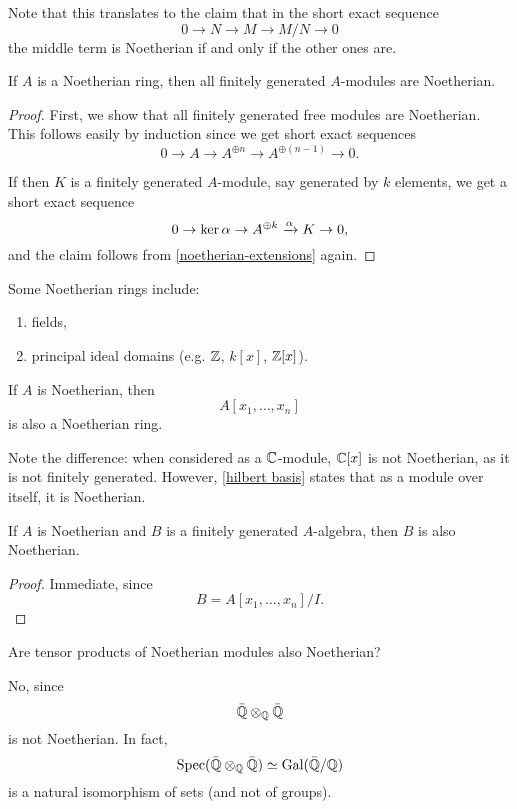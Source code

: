 Note that this translates to the claim that in the short exact sequence
\[ 0 \to N \to M \to M/{N} \to 0\]
the middle term is Noetherian if and only if the other ones are.

\begin{corollary}
  If $A$ is a Noetherian ring, then all finitely generated $A$-modules are Noetherian.
\end{corollary}
\begin{proof}
  First, we show that all finitely generated free modules are Noetherian. This follows easily by induction since we get short exact sequences
  \[ 0 \to A \to A^{\oplus n} \to A^{\oplus (n-1)} \to 0.\]

  If then $K$ is a finitely generated $A$-module, say generated by $k$ elements, we get a short exact sequence
  \[ 0 \to \ker{\alpha} \to A^{\oplus k} \xrightarrow{\alpha} K \to 0,\]
  and the claim follows from \cref{noetherian-extensions} again.
\end{proof}


\begin{example}
  Some Noetherian rings include:
  \begin{enumerate}
  \item fields,
  \item principal ideal domains (e.g. $\mathbb Z$, $k[x]$, $\mathbb Z[x]$).
  \end{enumerate}
\end{example}


\begin{theorem}
  \label{hilbert basis}
  If $A$ is Noetherian, then
  \[ A[x_1, \dotsc, x_n]\]
  is also a Noetherian ring.
\end{theorem}

Note the difference: when considered as a $\mathbb C$-module, $\mathbb C[x]$ is not Noetherian, as it is not finitely generated. However, \cref{hilbert basis} states that as a module over itself, it is Noetherian.

\begin{corollary}
  If $A$ is Noetherian and $B$ is a finitely generated $A$-algebra, then $B$ is also Noetherian.
\end{corollary}
\begin{proof}
  Immediate, since
  \[ B = A[x_1, \dotsc, x_n]/{I}.\]
\end{proof}

\begin{question}
  Are tensor products of Noetherian modules also Noetherian?
\end{question}
\begin{answer}
  No, since
  \[ \bar {\mathbb Q} \otimes_{\mathbb Q} \bar {\mathbb Q}\]
  is not Noetherian.
  In fact,
  \[ \text{Spec}(\bar {\mathbb Q} \otimes_{\mathbb Q} \bar {\mathbb Q} ) \simeq \text{Gal}(\bar{\mathbb Q}/{\mathbb Q}) \]
  is a natural isomorphism of sets (and not of groups).
\end{answer}

